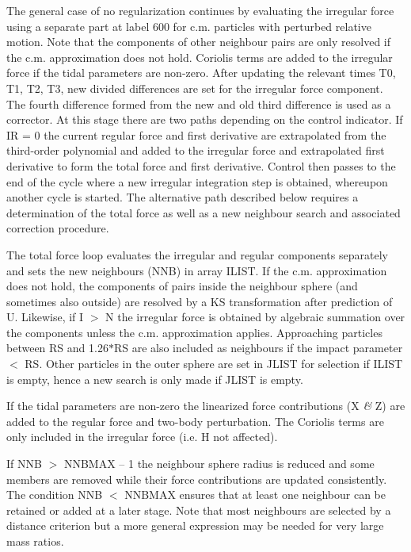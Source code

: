  The general case of no regularization continues by evaluating the irregular
 force using a separate part at label 600 for c.m. particles with perturbed
 relative motion.  Note that the components of other neighbour pairs are only
 resolved if the c.m. approximation does not 
 hold.  Coriolis terms are added to the irregular force if the tidal
 parameters are non-zero.  After updating the relevant times
 T0, T1, T2, T3, new divided differences are set for the
 irregular force component.  The fourth difference formed from the new
 and old third difference is used as a corrector.  At
    this stage there are two paths depending on the control indicator.  If
 IR = 0 the current regular force and first derivative are extrapolated from the
 third-order polynomial and added to the irregular force and extrapolated
 first derivative to form the total force and first derivative.  Control
  then passes to the end of the cycle where a new irregular integration
 step is obtained, whereupon another cycle is started.  The alternative path
 described below requires a determination of the total force as well as a
 new neighbour search and associated correction procedure.

 The total force loop evaluates the irregular and regular components
    separately and sets the new neighbours (NNB) in array ILIST.  If the c.m.
 approximation does not hold, the components of pairs inside the neighbour
 sphere (and sometimes also outside) are resolved by a KS transformation after
 prediction of U.  Likewise, if I $>$ N the irregular force is obtained
 by algebraic summation over the components unless the c.m.  
 approximation applies.  Approaching
 particles between RS and 1.26$\ast$RS are also included as neighbours if the
 impact parameter $<$ RS.  Other particles in the outer sphere are
 set in JLIST for selection if ILIST is empty, hence a new
 search is only made if JLIST is empty.  

  If the tidal
 parameters are non-zero the linearized force contributions (X {\it\&} Z) are added to
 the regular force and two-body perturbation.  The Coriolis terms are only
 included in the irregular force (i.e. H not affected).

 If NNB $>$ NNBMAX -- 1 the neighbour sphere radius is reduced and some members are
 removed while their force contributions are updated consistently.  The
 condition NNB $<$ NNBMAX ensures that at least one neighbour can be retained or
 added at a later
 stage.  Note that most neighbours are selected by a distance criterion but
 a more general expression may be needed for very large mass ratios.

